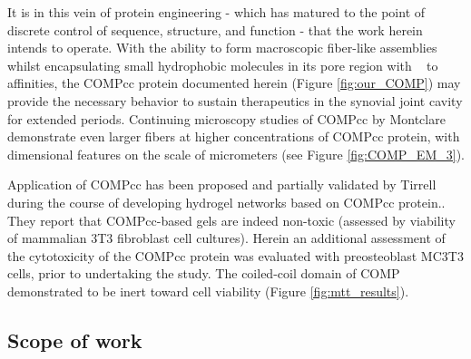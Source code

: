 \begin{refsection}
It is in this vein of protein engineering - which has matured to the point
of discrete control of sequence, structure, and function - that the work herein
intends to operate. With the ability to form macroscopic fiber-like assemblies
whilst encapsulating small hydrophobic molecules in its pore region with
\si{\micro\moLar} to \si{\nano\moLar} affinities,
the COMPcc protein documented herein (Figure
\ref{fig:our_COMP}) may provide the necessary behavior to sustain therapeutics
in the synovial joint cavity for extended periods. Continuing microscopy studies
of COMPcc by Montclare demonstrate even larger fibers at higher
concentrations of COMPcc protein, with dimensional features on the scale of
micrometers (see Figure \ref{fig:COMP_EM_3}).

Application of COMPcc has been proposed and partially validated by Tirrell
 during the course of developing hydrogel networks based on COMPcc
protein.\cite{Shen2006a}. They report that COMPcc-based gels
are indeed non-toxic (assessed by viability of mammalian 3T3 fibroblast cell
cultures). Herein an additional assessment of the cytotoxicity of the COMPcc
protein was evaluated with preosteoblast MC3T3 cells, prior to undertaking the
study. The coiled-coil domain of COMP demonstrated to be inert toward cell
viability (Figure \ref{fig:mtt_results}).

\subsection{Scope of work}


\end{refsection}
